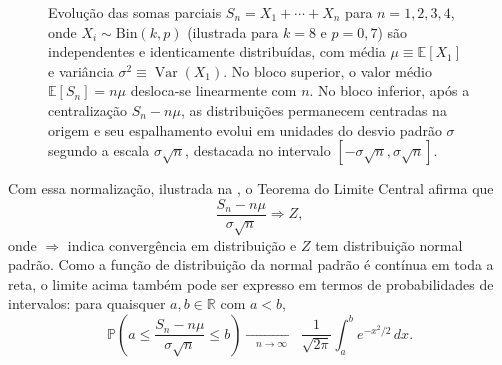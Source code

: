 \documentclass[12pt,portuguese]{article}
\theoremstyle{definition}
\theoremstyle{plainexercise}
\theoremstyle{starredexercise}
\theoremstyle{definition}
\begin{document}
\begin{figure}[H]
\caption{Evolução das somas parciais $S_n=X_1+\cdots+X_n$ para $n=1,2,3,4$,
onde $X_i\sim\mathrm{Bin}(k,p)$ (ilustrada para $k=8$ e $p=0{,}7$) são independentes e identicamente distribuídas, com média
$\mu\equiv\mathbb{E}[X_1]$ e variância $\sigma^2\equiv\operatorname{Var}(X_1)$. No bloco superior, o valor médio
$\mathbb{E}[S_n]=n\mu$ desloca-se linearmente com $n$. No bloco inferior, após
a centralização $S_n-n\mu$, as distribuições permanecem centradas na origem e
seu espalhamento evolui em unidades do desvio padrão $\sigma$ segundo a escala
$\sigma\sqrt{n}$, destacada no intervalo $[-\sigma\sqrt{n},\sigma\sqrt{n}]$.}
\label{fig:escalas-soma-tlc}
\end{figure}

Com essa normalização, ilustrada na , o Teorema do Limite Central afirma que
\[
\frac{S_n-n\mu}{\sigma\sqrt{n}}\Rightarrow Z,
\]
onde $\Rightarrow$ indica convergência em distribuição e $Z$ tem
distribuição normal padrão. Como a função de distribuição da normal padrão
é contínua em toda a reta, o limite acima
também pode ser expresso em termos de probabilidades de intervalos:
para quaisquer $a,b\in\mathbb{R}$ com $a<b$,
\[
\mathbb{P}\left(
a\leqslant\frac{S_n-n\mu}{\sigma\sqrt{n}}\leqslant b
\right)
\xrightarrow[\quad n\to\infty\quad]{}
\frac{1}{\sqrt{2\pi}}\int_a^b e^{-x^2/2}\,dx.
\]
\end{document}
